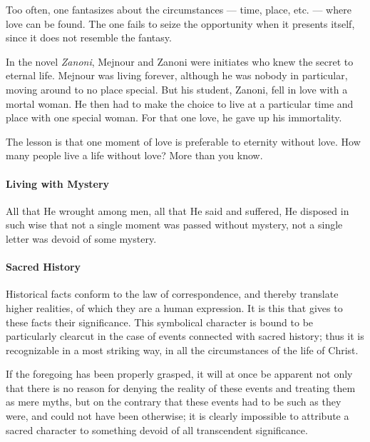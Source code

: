 Too often, one fantasizes about the circumstances --- time, place, etc. --- where love can be found. The one fails to seize the opportunity when it presents itself, since it does not resemble the fantasy.

In the novel \emph{Zanoni}, Mejnour and Zanoni were initiates who knew the secret to eternal life. Mejnour was living forever, although he was nobody in particular, moving around to no place special. But his student, Zanoni, fell in love with a mortal woman. He then had to make the choice to live at a particular time and place with one special woman. For that one love, he gave up his immortality.

The lesson is that one moment of love is preferable to eternity without love. How many people live a life without love? More than you know.

\paragraph{Living with Mystery}

\begin{quotex}
All that He wrought among men, all that He said and suffered, He disposed in such wise that not a single moment was passed without mystery, not a single letter was devoid of some mystery.
\end{quotex}

\paragraph{Sacred History}

\begin{quotationx}
Historical facts conform to the law of correspondence, and thereby translate higher realities, of which they are a human expression. It is this that gives to these facts their significance. This symbolical character is bound to be particularly clearcut in the case of events connected with sacred history; thus it is recognizable in a most striking way, in all the circumstances of the life of Christ.

If the foregoing has been properly grasped, it will at once be apparent not only that there is no reason for denying the reality of these events and treating them as mere myths, but on the contrary that these events had to be such as they were, and could not have been otherwise; it is clearly impossible to attribute a sacred character to something devoid of all transcendent significance. 
\end{quotationx}

